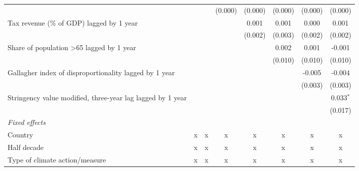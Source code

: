\begin{tabular}{lccccccc}
                                                                                &               &               & (0.000)       & (0.000)       & (0.000)       & (0.000)       & (0.000)\\   
   Tax revenue (\% of GDP) lagged by 1 year                                     &               &               &               & 0.001         & 0.001         & 0.000         & 0.001\\   
                                                                                &               &               &               & (0.002)       & (0.003)       & (0.002)       & (0.002)\\   
   Share of population >65 lagged by 1 year                                     &               &               &               &               & 0.002         & 0.001         & -0.001\\   
                                                                                &               &               &               &               & (0.010)       & (0.010)       & (0.010)\\   
   Gallagher index of disproportionality lagged by 1 year                       &               &               &               &               &               & -0.005        & -0.004\\   
                                                                                &               &               &               &               &               & (0.003)       & (0.003)\\   
   Stringency value modified, three-year lag lagged by 1 year                   &               &               &               &               &               &               & 0.033$^{*}$\\   
                                                                                &               &               &               &               &               &               & (0.017)\\   
   \emph{Fixed effects}\\
   Country                                                                      & x             & x             & x             & x             & x             & x             & x\\  
   Half decade                                                                  & x             & x             & x             & x             & x             & x             & x\\  
   Type of climate action/measure                                               & x             & x             & x             & x             & x             & x             & x\\  

\end{tabular}
